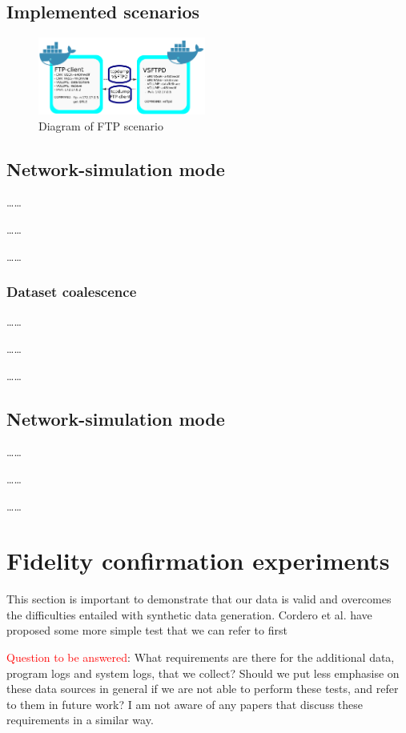 \documentclass[sigconf]{acmart}
\begin{document}
\subsection{Implemented scenarios}\label{Sec:ExistScen}


\begin{figure}%
\centering
\includegraphics[width=0.49\textwidth]{images/ftp_new1.png}
\caption{Diagram of FTP scenario}
\end{figure}


\subsection{Network-simulation mode}
\dots \dots

\dots \dots

\dots \dots
\subsubsection{Dataset coalescence}\label{Sec:datasetcreation}
\dots \dots

\dots \dots

\dots \dots

\subsection{Network-simulation mode}

\dots \dots

\dots \dots

\dots \dots


\section{Fidelity confirmation experiments}\label{Sec:Experiments}

This section is important to demonstrate that our data is valid and overcomes the difficulties entailed with synthetic data generation. Cordero et al. have proposed some more simple test that we can refer to first

\textcolor{red}{Question to be answered}: What requirements are there for the additional data, program logs and system logs, that we collect? Should we put less emphasise on these data sources in general if we are not able to perform these tests, and refer to them in future work? I am not aware of any papers that discuss these requirements in a similar way. 
\end{document}
